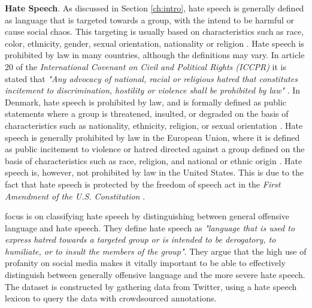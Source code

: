 \documentclass{article}
\begin{document}
\textbf{Hate Speech}. As discussed in Section \ref{ch:intro}, hate speech is generally defined as language that is targeted towards a group, with the intend to be harmful or cause social chaos. This targeting is usually based on characteristics such as race, color, ethnicity, gender, sexual orientation, nationality or religion \cite{schmidt2017survey}. Hate speech is prohibited by law in many countries, although the definitions may vary. In article 20 of the \textit{International Covenant on Civil and Political Rights (ICCPR)} it is stated that \textit{"Any advocacy of national, racial or religious hatred that constitutes incitement to discrimination, hostility or violence shall be prohibited by law"} \cite{joseph2013international}. In Denmark, hate speech is prohibited by law, and is formally defined as public statements where a group is threatened, insulted, or degraded on the basis of characteristics such as nationality, ethnicity, religion, or sexual orientation \cite{danskHatespeechLaw}. 
Hate speech is  generally prohibited by law in the European Union, where it is defined as public incitement to violence or hatred directed against a group defined on the basis of characteristics such as race, religion, and national or ethnic origin \cite{euHateSpeechLaw}. Hate speech is, however, not prohibited by law in the United States. This is due to the fact that hate speech is protected by the freedom of speech act in the \textit{First Amendment of the U.S. Constitution} \cite{usFirstAmend}.

\cite{davidson2017automated} focus is on classifying hate speech by  distinguishing between general offensive language and hate speech. They define hate speech as \textit{"language that is used to express hatred towards a targeted group or is intended to be derogatory, to humiliate, or to insult the members of the group"}. They argue that the high use of profanity on social media makes it vitally important to be able to effectively distinguish between generally offensive language and the more severe hate speech. The dataset is constructed by gathering data from Twitter, using a hate speech lexicon to query the data with crowdsourced annotations.
\end{document}
